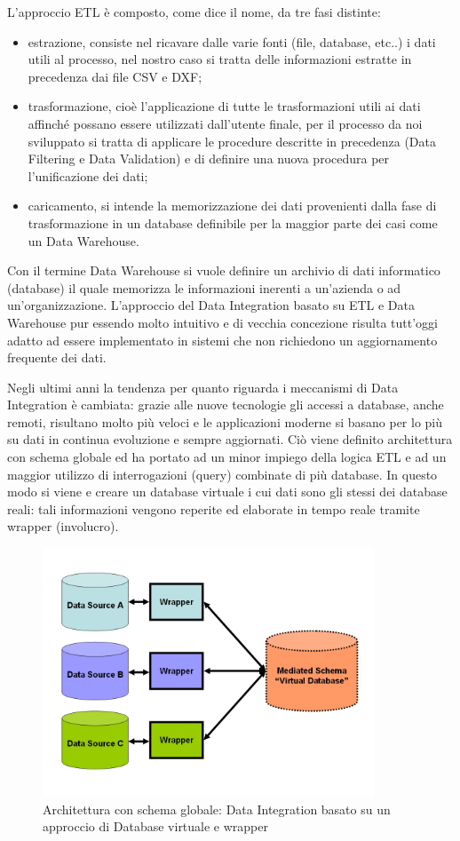 \documentclass[12pt]{report}
\begin{document}
L'approccio ETL è composto, come dice il nome, da tre fasi distinte:
\begin{itemize}
\item estrazione, consiste nel ricavare dalle varie fonti (file, database, etc..) i dati utili al processo, nel nostro caso si tratta delle informazioni estratte in precedenza dai file CSV e DXF;
\item trasformazione, cioè l'applicazione di tutte le trasformazioni utili ai dati affinché possano essere utilizzati dall'utente finale, per il processo da noi sviluppato si tratta di applicare le procedure descritte in precedenza (Data Filtering e Data Validation) e di definire una nuova procedura per l'unificazione dei dati;
\item caricamento, si intende la memorizzazione dei dati provenienti dalla fase di trasformazione in un database definibile per la maggior parte dei casi come un Data Warehouse.
\end{itemize}


Con il termine Data Warehouse si vuole definire un archivio di dati informatico (database) il quale memorizza le informazioni inerenti a un'azienda o ad un'organizzazione.
L'approccio del Data Integration basato su ETL e Data Warehouse pur essendo molto intuitivo e di vecchia concezione risulta tutt'oggi adatto ad essere implementato in sistemi che non richiedono un aggiornamento frequente dei dati.

Negli ultimi anni la tendenza per quanto riguarda i meccanismi di Data Integration è cambiata: grazie alle nuove tecnologie gli accessi a database, anche remoti, risultano molto più veloci e le applicazioni moderne si basano per lo più su dati in continua evoluzione e sempre aggiornati.
Ciò viene definito architettura con schema globale ed ha portato ad un minor impiego della logica ETL e ad un maggior utilizzo di interrogazioni (query) combinate di più database.
In questo modo si viene e creare un database virtuale i cui dati sono gli stessi dei database reali: tali informazioni vengono reperite ed elaborate in tempo reale tramite wrapper (involucro).

\begin{figure}[H]
    \centering
    \includegraphics[width=280pt]{Dataintegration+Wrapper.jpg}
    \caption{Architettura con schema globale: Data Integration basato su un approccio di Database virtuale e wrapper}
    \label{fig:Data_Integration_Wrapper}
\end{figure}
\end{document}
